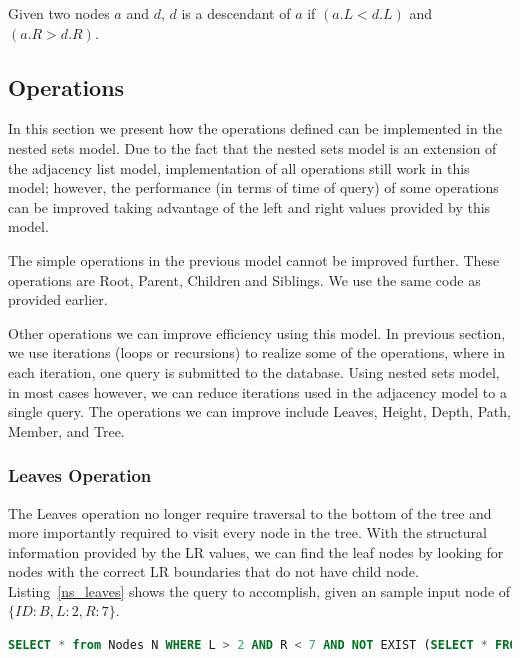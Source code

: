\begin{property}\label{p_ns_desc}
Given two nodes $a$ and $d$, $d$ is a descendant of $a$ if $(a.L < d.L)$ and $(a.R > d.R)$.
\end{property}


\subsection{Operations}

In this section we present how the operations defined can be implemented in the nested sets model. Due to the fact that the nested sets model is an extension of the adjacency list model, implementation of all operations still work in this model; however, the performance (in terms of time of query) of some operations can be improved taking advantage of the left and right values provided by this model.

The simple operations in the previous model cannot be improved further. These operations are Root, Parent, Children and Siblings. We use the same code as provided earlier.


Other operations we can improve efficiency using this model. In previous section, we use iterations (loops or recursions) to realize some of the operations, where in each iteration, one query is submitted to the database. Using nested sets model, in most cases however, we can reduce iterations used in the adjacency model to a single query. The operations we can improve include Leaves, Height, Depth, Path, Member, and Tree.

\subsubsection{Leaves Operation}

The Leaves operation no longer require traversal to the bottom of the tree and more importantly required to visit every node in the tree. With the structural information provided by the LR values, we can find the leaf nodes by looking for nodes with the correct LR boundaries that do not have child node. Listing~\ref{ns_leaves} shows the query to accomplish, given an sample input node of $\{ID:B, L:2, R:7\}$.

\begin{lstlisting}[language=sql,caption={Nested Sets Leaves Operation},label=ns_leaves]
SELECT * from Nodes N WHERE L > 2 AND R < 7 AND NOT EXIST (SELECT * FROM Nodes WHERE Parent=N.ID) 
\end{lstlisting}

